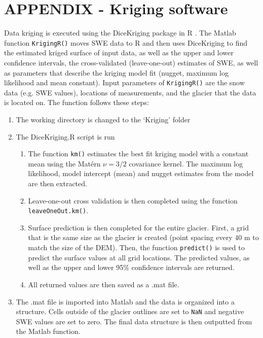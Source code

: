 \documentclass[12pt]{article}
\begin{document}
\section{APPENDIX - Kriging software}
\label{sec:KrigingMethods}
Data kriging is executed using the DiceKriging package in R \citep{Roustant2012}. The Matlab function \texttt{KrigingR()} moves SWE data to R and then uses DiceKriging to find the estimated kriged surface of input data, as well as the upper and lower confidence intervals, the cross-validated (leave-one-out) estimates of SWE, as well as parameters that describe the kriging model fit (nugget, maximum log likelihood and mean constant). Input parameters of  \texttt{KrigingR()} are the snow data (e.g. SWE values), locations of measurements, and the glacier that the data is located on. The function follows these steps:
\begin{enumerate}
\item The working directory is changed to the `Kriging' folder
\item The DiceKriging.R script is run
	\begin{enumerate}
	\item The function \texttt{km()} estimates the best fit kriging model with a constant mean using the Mat\'ern $\nu = 3/2$ covariance kernel. The maximum log likelihood, model intercept (mean) and nugget estimates from the model are then extracted. 
	\item Leave-one-out cross validation is then completed using the function \texttt{leaveOneOut.km()}.
	\item Surface prediction is then completed for the entire glacier. First, a grid that is the same size as the glacier is created (point spacing every 40 m to match the size of the DEM). Then, the function \texttt{predict()} is used to predict the surface values at all grid locations. The predicted values, as well as the upper and lower 95\% confidence intervals are returned. 
	\item All returned values are then saved as a .mat file.
	\end{enumerate}
\item The .mat file is imported into Matlab and the data is organized into a structure. Cells outside of the glacier outlines are set to \texttt{NaN} and negative SWE values are set to zero. The final data structure is then outputted from the Matlab function. 
\end{enumerate}
\end{document}
